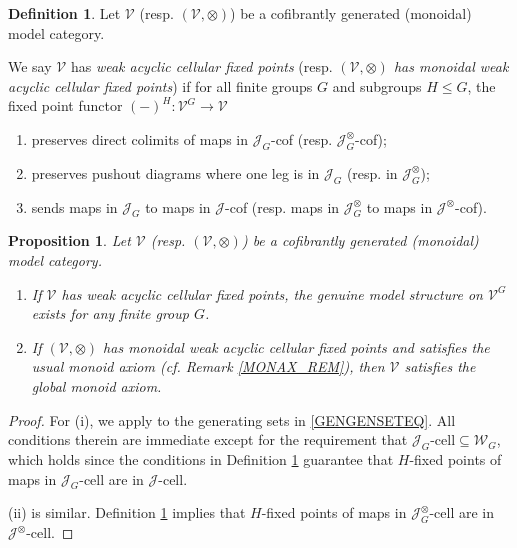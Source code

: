 \documentclass[a4paper,10pt
,draft
]{article}%
\numberwithin{equation}{section}
\numberwithin{figure}{section}
\newtheorem{proposition}[equation]{Proposition}%
\theoremstyle{definition} %
\newtheorem{definition}[equation]{Definition}%
\newcommand{\Set}{\ensuremath{\mathsf{Set}}}
\newcommand{\V}{\ensuremath{\mathcal V}}
\newcommand{\1}{\ensuremath{\mathbbm 1}}%
\begin{document}
\begin{definition}\label{WEAKCELL DEF}
Let $\V$ (resp. $(\V,\otimes)$)
be a cofibrantly generated (monoidal) model category.

	We say $\V$ has \textit{weak acyclic cellular fixed points}
	(resp. \textit{$(\V,\otimes)$ has monoidal weak acyclic cellular fixed points}) if
	for all finite groups $G$ and subgroups $H \leq G$,
	the fixed point functor $(-)^H \colon \V^G \to \V$
\begin{enumerate}[label = (\roman*)]
	\item preserves direct colimits of maps in $\mathcal J_G$-cof (resp. $\mathcal {J}^{\otimes}_G$-cof);
	\item preserves pushout diagrams 
	where one leg is in $\mathcal J_G$ 
	(resp. in $\mathcal {J}^{\otimes}_G$);
	\item sends maps in $\mathcal J_G$ to maps in $\mathcal J$-cof (resp. maps in $\mathcal {J}^{\otimes}_G$ to maps in 
	$\mathcal{J}^{\otimes}$-cof).
\end{enumerate}
\end{definition}


\begin{proposition}\label{WEAKCELL PROP}
	Let $\V$ (resp. $(\V,\otimes)$) be a cofibrantly generated (monoidal) model category.
	\begin{enumerate}[label=(\roman*)]
		\item If $\V$ has weak acyclic cellular fixed points, 
		the genuine model structure on $\V^G$
		exists for any finite group $G$.
		\item If $(\V,\otimes)$ has monoidal weak acyclic cellular fixed points and satisfies the usual monoid axiom
		(cf. Remark \ref{MONAX_REM}),
		then $\V$ satisfies the global monoid axiom.
	\end{enumerate}
\end{proposition}

\begin{proof}
For (i), we apply \cite[Theorem 2.1.19]{Hov} to the generating sets in 
\eqref{GENGENSETEQ}.
All conditions therein are immediate 
except for the requirement that
$\mathcal{J}_{G}\text{-cell} \subseteq \mathcal{W}_G$,
which holds since the conditions in Definition \ref{WEAKCELL DEF}
guarantee that $H$-fixed points of maps in 
$\mathcal{J}_{G}$-cell are in $\mathcal{J}$-cell.

(ii) is similar. Definition \ref{WEAKCELL DEF}
implies that $H$-fixed points of maps in 
$\mathcal{J}^{\otimes}_{G}$-cell are in $\mathcal{J}^{\otimes}$-cell.
\end{proof}
\end{document}

